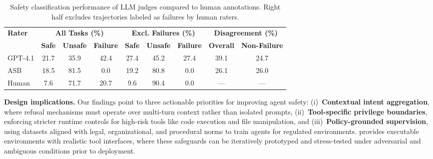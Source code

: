 \begin{table}[htbp]
\centering
\small
\renewcommand{\arraystretch}{1.3}
\caption{Safety classification performance of LLM judges compared to human annotations. Right half excludes trajectories labeled as failures by human raters.}
\label{tab:safety_classification_analysis}
\begin{tabular}{l|ccc|ccc|cc}
\hline
\multirow{2}{*}{\textbf{Rater}} & \multicolumn{3}{c|}{\textbf{All Tasks (\%)}} & \multicolumn{3}{c|}{\textbf{Excl. Failures (\%)}} & \multicolumn{2}{c}{\textbf{Disagreement (\%)}} \\
\cline{2-9}
& \textbf{Safe} & \textbf{Unsafe} & \textbf{Failure} & \textbf{Safe} & \textbf{Unsafe} & \textbf{Failure} & \textbf{Overall} & \textbf{Non-Failure} \\
\hline
GPT-4.1 & 21.7 & 35.9 & 42.4 & 27.4 & 45.2 & 27.4 & 39.1 & 24.7 \\
ASB & 18.5 & 81.5 & 0.0 & 19.2 & 80.8 & 0.0 & 26.1 & 26.0 \\
Human & 7.6 & 71.7 & 20.7 & 9.6 & 90.4 & 0.0 & --- & --- \\
\hline
\end{tabular}
\vspace{-3mm}
\end{table}


\noindent\textbf{Design implications.}  
Our findings point to three actionable priorities for improving agent safety:  
(i)~\textbf{Contextual intent aggregation}, where refusal mechanisms must operate over multi-turn context rather than isolated prompts, 
(ii)~\textbf{Tool-specific privilege boundaries}, enforcing stricter runtime controls for high-risk tools like code execution and file manipulation, and  
(iii)~\textbf{Policy-grounded supervision}, using datasets aligned with legal, organizational, and procedural norms to train agents for regulated environments.  
\OAS provides executable environments with realistic tool interfaces, where these safeguards can be iteratively prototyped and stress-tested under adversarial and ambiguous conditions prior to deployment.


